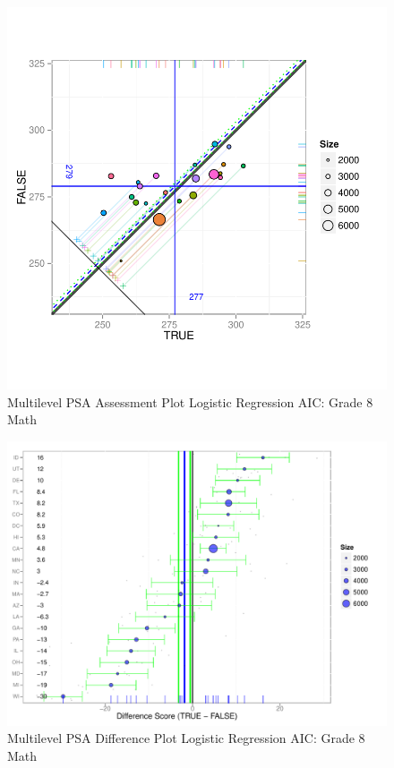 \begin{figure}[h!]
\begin{center}
\includegraphics[width=\textwidth]{../Figures2009/g8math-mlpsa-lrAIC-circ.pdf}
\caption{Multilevel PSA Assessment Plot Logistic Regression AIC: Grade 8 Math}
\end{center}
\end{figure}

\begin{figure}[h!]
\begin{center}
\includegraphics[width=\textwidth]{../Figures2009/g8math-mlpsa-lrAIC-diff.pdf}
\caption{Multilevel PSA Difference Plot Logistic Regression AIC: Grade 8 Math}
\end{center}
\end{figure}

